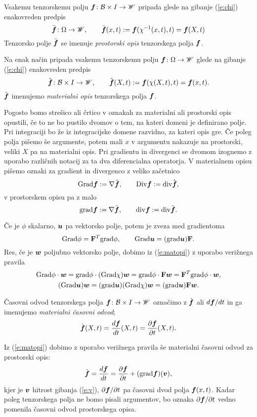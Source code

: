 Vsakemu tenzorskemu polju $\boldsymbol f\colon \mathcal B\times I\to\mathscr W$ pripada glede na gibanje
(\ref{e:chi}) enakovreden predpis
\[
	\bar{\boldsymbol f}\colon\Omega\to\mathscr W,\qquad
	\bar{\boldsymbol f}(x,t):=\boldsymbol f(\chi^{-1}(x,t),t)=\boldsymbol f(X,t)
\]
Tenzorsko polje $\bar{\boldsymbol f}$ se imenuje \emph{prostorski opis} tenzorskega polja $\boldsymbol f$.

Na enak način pripada vsakemu tenzorskemu polju $\boldsymbol f\colon\Omega\to\mathscr W$
glede na gibanje (\ref{e:chi}) enakovreden predpis
\begin{equation} \label{e:matopi}
	\hat{\boldsymbol f}\colon \mathcal B\times I\to\mathscr W,\qquad
	\hat{\boldsymbol f}(X,t):=\boldsymbol f(\chi(X,t),t)=\boldsymbol f(x,t).
\end{equation}
$\hat{\boldsymbol f}$ imenujemo \emph{materialni opis} tenzorskega polja $\boldsymbol f$.

Pogosto bomo strešico ali črtico v oznakah za materialni ali prostorski opis opustili,
če to ne bo pustilo dvomov o tem, na kateri domeni je definirano polje.
Pri integraciji bo že iz integracijske domene razvidno, za kateri opis gre.
Če poleg polja pišemo še argumente, potem mali $x$ v argumentu nakazuje na prostorski,
veliki $X$ pa na materialni opis.
Pri gradientu in divergenci se dvomom izognemo z uporabo različnih notacij
za ta dva diferencialna operatorja.
V materialnem opisu pišemo oznaki za gradient in divergenco z veliko začetnico
\[ \mathrm{Grad}\boldsymbol f:=\nabla\hat{\boldsymbol f},\qquad \mathrm {Div}\boldsymbol f:=\mathrm{div}\hat{\boldsymbol f}, \]
v prostorskem opisu pa z malo
\[ \mathrm{grad}\boldsymbol f:=\nabla\bar{\boldsymbol f},\qquad \mathrm{div}\boldsymbol f:=\mathrm{div}\bar{\boldsymbol f}. \]

Če je $\phi$ skalarno, $\boldsymbol u$ pa vektorsko polje, potem je zveza med gradientoma
\begin{equation}\label{e:gz}
	\mathrm{Grad}\phi=\mathbf F^{T}\mathrm{grad}\phi,\qquad \mathrm{Grad}\boldsymbol u=(\mathrm{grad}\boldsymbol u)\mathbf F.
\end{equation}
Res, če je $\boldsymbol w$ poljubno vektorsko polje, dobimo iz (\ref{e:matopi})
z uporabo verižnega pravila
\begin{gather*}
	\mathrm{Grad}\phi\cdot\boldsymbol w=\mathrm{grad}\phi\cdot(\mathrm{Grad}\chi)\boldsymbol w=
	\mathrm{grad}\phi\cdot \mathbf F\boldsymbol w=\mathbf F^{T}\mathrm{grad}\phi\cdot\boldsymbol w, \\
	(\mathrm{Grad}\boldsymbol u)\boldsymbol w=(\mathrm{grad}\boldsymbol u)(\mathrm{Grad}\chi)\boldsymbol w
	=(\mathrm{grad}\boldsymbol u)\mathbf F\boldsymbol w.
\end{gather*}

\begin{definicija}
	Časovni odvod tenzorskega polja $\boldsymbol f\colon \mathcal B\times I\to\mathscr W$ označimo z
	$\dot{\boldsymbol f}$ ali $d\boldsymbol f/dt$ in ga imenujemo \emph{materialni časovni odvod};
	\[ \dot{\boldsymbol f}(X,t)=\frac{d\boldsymbol f}{dt}(X,t)=\frac{\partial\boldsymbol f}{\partial t}(X,t). \]
\end{definicija}
Iz (\ref{e:matopi}) dobimo z uporabo verižnega pravila še materialni časovni odvod za prostorski opis:
\begin{equation} \label{e:matodv}
	\dot{\boldsymbol f}=\frac{d\boldsymbol f}{dt}=
	\frac{\partial\boldsymbol f}{\partial t}+(\mathrm{grad}\boldsymbol f)(\boldsymbol v),
\end{equation}
kjer je $\boldsymbol v$ hitrost gibanja (\ref{e:v}), $\partial\boldsymbol f/\partial t$ pa
časovni dvod polja $\boldsymbol f(x,t)$. Kadar poleg tenzorskega polja ne bomo pisali argumentov,
bo oznaka $\partial\boldsymbol f/\partial t$ vedno pomenila časovni odvod prostorskega opisa.

